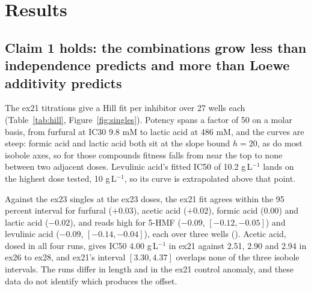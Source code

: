 
\section{Results}
\label{sec:results}

\subsection{Claim 1 holds: the combinations grow less than independence predicts and
more than Loewe additivity predicts}
\label{sec:claim1}

 The ex21 titrations give a Hill fit per inhibitor over 27
wells each (Table~\ref{tab:hill}, Figure~\ref{fig:singles}). Potency spans a factor of
50 on a molar basis, from furfural at IC30 9.8 mM to lactic acid at 486 mM, and the
curves are steep: formic acid and lactic acid both sit at the slope bound $h = 20$, as do
most isobole axes, so for those compounds fitness falls from near the top to none between
two adjacent doses. Levulinic acid's fitted IC50 of 10.2 g\,L$^{-1}$ lands on the highest
dose tested, 10 g\,L$^{-1}$, so its curve is extrapolated above that point.

Against the ex23 singles at the ex23 doses, the ex21 fit agrees within the 95 percent
interval for furfural ($+0.03$), acetic acid ($+0.02$), formic acid ($0.00$) and lactic
acid ($-0.02$), and reads high for 5-HMF ($-0.09$, $[-0.12, -0.05]$) and levulinic acid
($-0.09$, $[-0.14, -0.04]$), each over three wells
(). Acetic acid, dosed in all four runs,
gives IC50 4.00 g\,L$^{-1}$ in ex21 against 2.51, 2.90 and 2.94 in ex26 to ex28, and
ex21's interval $[3.30, 4.37]$ overlaps none of the three isobole intervals. The runs
differ in length and in the ex21 control anomaly, and these data do not identify which
produces the offset.

\begin{table}[htbp]
\centering
\footnotesize
\caption[]{The ex21 single-agent Hill fits, primary variant (a well that did not grow
enters at fitness 0). The fitted top is the curve's own uninhibited asymptote, used in
place of the ex21 controls. A slope at 20 is at its upper bound and marks a cliff
between two adjacent doses, so the IC50 interval there understates the uncertainty.
Intervals are 95 percent percentiles of 1000 resamples of replicate wells within each
dose.}
\label{tab:hill}

\end{table}

